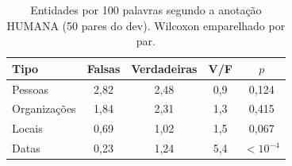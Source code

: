 \begin{table}[t]\centering\small
\caption{Entidades por 100 palavras segundo a anotação HUMANA (50 pares do dev). Wilcoxon emparelhado por par.}\label{tab:iegold}
\begin{tabular}{lcccc}
\toprule
Tipo & Falsas & Verdadeiras & V/F & $p$ \\
\midrule
Pessoas & 2,82 & 2,48 & 0,9 & 0,124 \\
Organizações & 1,84 & 2,31 & 1,3 & 0,415 \\
Locais & 0,69 & 1,02 & 1,5 & 0,067 \\
Datas & 0,23 & 1,24 & 5,4 & $<10^{-4}$ \\
\bottomrule
\end{tabular}
\end{table}
